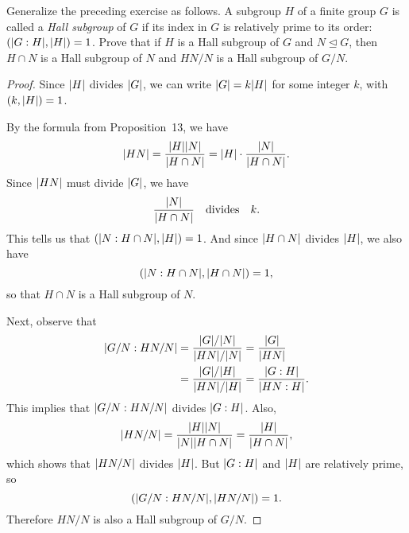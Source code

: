  Generalize the preceding exercise as follows. A subgroup
$H$ of a finite group $G$ is called a {\em Hall subgroup} of $G$ if
its index in $G$ is relatively prime to its order:
$(\lvert{G:H}\rvert,\lvert{H}\rvert)=1$. Prove that if $H$ is a Hall subgroup of $G$
and $N\trianglelefteq G$, then $H\cap N$ is a Hall subgroup of $N$ and
$HN/N$ is a Hall subgroup of $G/N$.
\begin{proof}
  Since $\lvert{H}\rvert$ divides $\lvert{G}\rvert$, we can write $\lvert{G}\rvert = k\lvert{H}\rvert$
  for some integer $k$, with $(k,\lvert{H}\rvert) = 1$.

  By the formula from Proposition~13, we have
  \begin{equation*}
    \lvert{HN}\rvert = \frac{\lvert{H}\rvert\lvert{N}\rvert}{\lvert{H\cap N}\rvert}
    = \lvert{H}\rvert\cdot\frac{\lvert{N}\rvert}{\lvert{H\cap N}\rvert}.
  \end{equation*}
  Since $\lvert{HN}\rvert$ must divide $\lvert{G}\rvert$, we have
  \begin{equation*}
    \frac{\lvert{N}\rvert}{\lvert{H\cap N}\rvert}
    \quad\text{divides}\quad
    k.
  \end{equation*}
  This tells us that $(\lvert{N:H\cap N}\rvert, \lvert{H}\rvert) = 1$. And since
  $\lvert{H\cap N}\rvert$ divides $\lvert{H}\rvert$, we also have
  \begin{equation*}
    (\lvert{N:H\cap N}\rvert, \lvert{H\cap N}\rvert) = 1,
  \end{equation*}
  so that $H\cap N$ is a Hall subgroup of $N$.

  Next, observe that
  \begin{align*}
    \lvert{G/N:HN/N}\rvert
    &= \frac{\lvert{G}\rvert/\lvert{N}\rvert}{\lvert{HN}\rvert/\lvert{N}\rvert}
    = \frac{\lvert{G}\rvert}{\lvert{HN}\rvert} \\
    &= \frac{\lvert{G}\rvert/\lvert{H}\rvert}{\lvert{HN}\rvert/\lvert{H}\rvert}
    = \frac{\lvert{G:H}\rvert}{\lvert{HN:H}\rvert}.
  \end{align*}
  This implies that $\lvert{G/N:HN/N}\rvert$ divides $\lvert{G:H}\rvert$. Also,
  \begin{equation*}
    \lvert{HN/N}\rvert
    = \frac{\lvert{H}\rvert\lvert{N}\rvert}{\lvert{N}\rvert\lvert{H\cap N}\rvert}
    = \frac{\lvert{H}\rvert}{\lvert{H\cap N}\rvert},
  \end{equation*}
  which shows that $\lvert{HN/N}\rvert$ divides $\lvert{H}\rvert$. But $\lvert{G:H}\rvert$ and
  $\lvert{H}\rvert$ are relatively prime, so
  \begin{equation*}
    (\lvert{G/N:HN/N}\rvert, \lvert{HN/N}\rvert) = 1.
  \end{equation*}
  Therefore $HN/N$ is also a Hall subgroup of $G/N$.
\end{proof}
